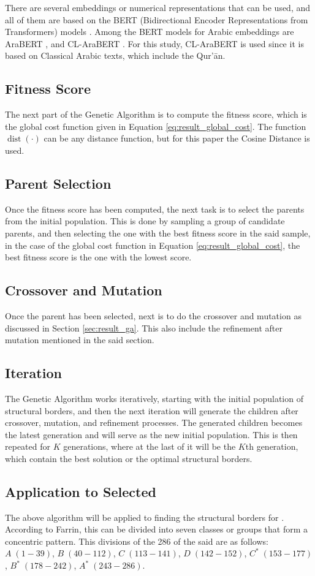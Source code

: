 There are several embeddings or numerical representations that can be used, and all of them are based on the BERT (Bidirectional Encoder Representations from Transformers) models \cite{devlin2018bert}. Among the BERT models for Arabic embeddings are AraBERT \cite{mahboub2024evaluation}, and CL-AraBERT \cite{MALHAS2022103068}. For this study, CL-AraBERT is used since it is based on Classical Arabic texts, which include the Qur'\=an.
\subsection{Fitness Score}
The next part of the Genetic Algorithm is to compute the fitness score, which is the global cost function given in Equation \ref{eq:result_global_cost}. The function $\operatorname{dist}(\cdot)$ can be any distance function, but for this paper the Cosine Distance is used.
\subsection{Parent Selection}
Once the fitness score has been computed, the next task is to select the parents from the initial population. This is done by sampling a group of candidate parents, and then selecting the one with the best fitness score in the said sample, in the case of the global cost function in Equation \ref{eq:result_global_cost}, the best fitness score is the one with the lowest score.
\subsection{Crossover and Mutation}
Once the parent has been selected, next is to do the crossover and mutation as discussed in Section \ref{sec:result_ga}. This also include the refinement after mutation mentioned in the said section.
\subsection{Iteration}
The Genetic Algorithm works iteratively, starting with the initial population of structural borders, and then the next iteration will generate the children after crossover, mutation, and refinement processes. The generated children becomes the latest generation and will serve as the new initial population. This is then repeated for $K$ generations, where at the last of it will be the $K$th generation, which contain the best solution or the optimal structural borders.

\subsection{Application to Selected  }
The above algorithm will be applied to finding the structural borders for  . According to Farrin, this   can be divided into seven classes or groups that form a concentric pattern. This divisions of the 286   of the said   are as follows: $A\;(1-39)$, $B\;(40-112)$, $C\;(113-141)$, $D\;(142-152)$, $C^*\;(153-177)$, $B^*\;(178-242)$, $A^*\;(243-286)$. 

